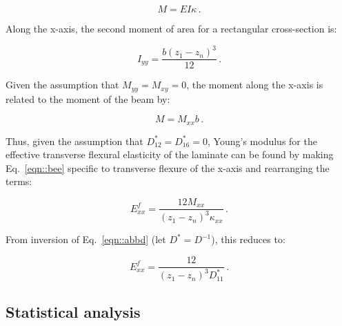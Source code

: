 \documentclass[twocolumn, linenumbers, superscriptaddress, nofootinbib]{revtex4-1}
\begin{document}
				\begin{equation}
				\label{eqn::bee}
				M = EI\kappa\,.
				\end{equation}
				
				Along the x-axis, the second moment of area for a rectangular cross-section is:
				
				\begin{equation}
					I_{yy} = \frac{b(z_1 - z_n)^3}{12}\,.
				\end{equation}	
				
				Given the assumption that $M_{yy} = M_{xy} = 0$, the moment along the x-axis is related to the moment of the beam by:
				
				\begin{equation}
					M = M_{xx}b\,.
				\end{equation}
				
				Thus, given the assumption that $D^*_{12} = D^*_{16} = 0$, Young's modulus for the effective transverse flexural elasticity of the laminate can be found by making Eq.~\ref{eqn::bee} specific to transverse flexure of the x-axis and rearranging the terms:
				
				\begin{equation}
					E^f_{xx} = \frac{12M_{xx}}{(z_1 - z_n)^3\kappa_{xx}}\,.
				\end{equation}
				
				From inversion of Eq.~\ref{eqn::abbd} (let $D^* = D^{-1}$), this reduces to:
				
				\begin{equation}
					E^f_{xx} = \frac{12}{(z_1 - z_n)^3D^*_{11}}\,.
				\end{equation}
					
		\subsection*{Statistical analysis}
\end{document}
